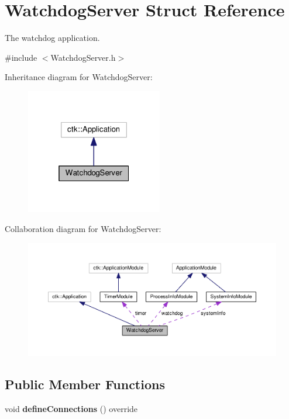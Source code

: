 \hypertarget{structWatchdogServer}{}\section{Watchdog\+Server Struct Reference}
\label{structWatchdogServer}


The watchdog application.  




{\ttfamily \#include $<$Watchdog\+Server.\+h$>$}



Inheritance diagram for Watchdog\+Server\+:
\nopagebreak
\begin{figure}[H]
\begin{center}
\leavevmode
\includegraphics[width=169pt]{structWatchdogServer__inherit__graph}
\end{center}
\end{figure}


Collaboration diagram for Watchdog\+Server\+:
\nopagebreak
\begin{figure}[H]
\begin{center}
\leavevmode
\includegraphics[width=350pt]{structWatchdogServer__coll__graph}
\end{center}
\end{figure}
\subsection*{Public Member Functions}
\begin{DoxyCompactItemize}
\item 
void {\bfseries define\+Connections} () override\hypertarget{structWatchdogServer_a08c98672aee20a4640a56b3b5ac7cd47}{}\label{structWatchdogServer_a08c98672aee20a4640a56b3b5ac7cd47}

\end{DoxyCompactItemize}
